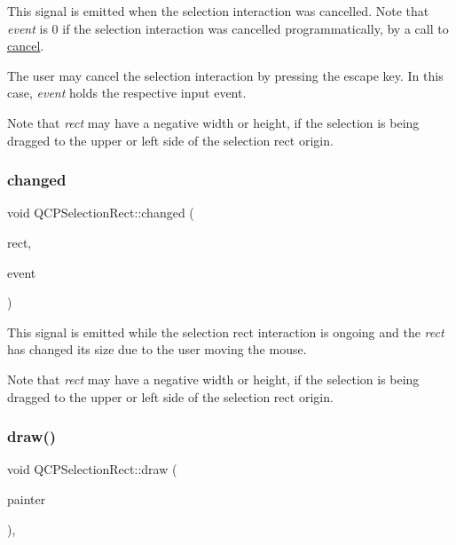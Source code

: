This signal is emitted when the selection interaction was cancelled. Note that {\itshape event} is 0 if the selection interaction was cancelled programmatically, by a call to \hyperlink{class_q_c_p_selection_rect_af67bc58f4f5ce9a4dc420b9c42de235a}{cancel}.

The user may cancel the selection interaction by pressing the escape key. In this case, {\itshape event} holds the respective input event.

Note that {\itshape rect} may have a negative width or height, if the selection is being dragged to the upper or left side of the selection rect origin. \mbox{\label{class_q_c_p_selection_rect_a1bab11026bca52740c2e6682623e6964}} 
\subsubsection{\texorpdfstring{changed}{changed}}
{\footnotesize\ttfamily void Q\+C\+P\+Selection\+Rect\+::changed (\begin{DoxyParamCaption}\item[{const Q\+Rect \&}]{rect,  }\item[{Q\+Mouse\+Event $\ast$}]{event }\end{DoxyParamCaption})\hspace{0.3cm}{\ttfamily [signal]}}

This signal is emitted while the selection rect interaction is ongoing and the {\itshape rect} has changed its size due to the user moving the mouse.

Note that {\itshape rect} may have a negative width or height, if the selection is being dragged to the upper or left side of the selection rect origin. \mbox{\label{class_q_c_p_selection_rect_ab0e50ae796508bdcd97ab8c335c593bf}} 
\subsubsection{\texorpdfstring{draw()}{draw()}}
{\footnotesize\ttfamily void Q\+C\+P\+Selection\+Rect\+::draw (\begin{DoxyParamCaption}\item[{\hyperlink{class_q_c_p_painter}{Q\+C\+P\+Painter} $\ast$}]{painter }\end{DoxyParamCaption})\hspace{0.3cm}{\ttfamily [protected]}, {\ttfamily [virtual]}}



